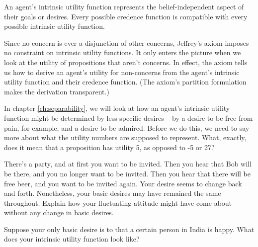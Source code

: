 An agent's intrinsic utility function represents the belief-independent aspect
of their goals or desires. Every possible credence function is compatible with
every possible intrinsic utility function.

Since no concern is ever a disjunction of other concerns, Jeffrey's axiom
imposes no constraint on intrinsic utility functions. It only enters the picture
when we look at the utility of propositions that aren't concerns. In effect, the
axiom tells us how to derive an agent's utility for non-concerns from the
agent's intrinsic utility function and their credence function. (The axiom's
partition formulation makes the derivation transparent.)
 
In chapter \ref{ch:separability}, we will look at how an agent's intrinsic
utility function might be determined by less specific desires -- by a desire to
be free from pain, for example, and a desire to be admired. Before we do this,
we need to say more about what the utility numbers are supposed to represent.
What, exactly, does it mean that a proposition has utility 5, as opposed to -5
or 27?


\begin{exercise}{1}
  There's a party, and at first you want to be invited. Then you hear that Bob
  will be there, and you no longer want to be invited. Then you hear that
  there will be free beer, and you want to be invited again. Your desire seems
  to change back and forth. Nonetheless, your basic desires may have
  remained the same throughout. Explain how your fluctuating attitude
  might have come about without any change in basic desires.
\end{exercise}

\begin{exercise}{1}
  Suppose your only basic desire is to that a certain person in India is happy.
  What does your intrinsic utility function look like?
\end{exercise}

